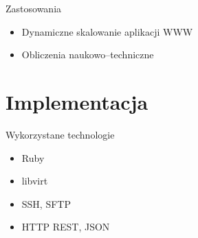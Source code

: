 \documentclass{beamer}
\begin{document}
\begin{frame}{Zastosowania}
  \begin{itemize}
    \item Dynamiczne skalowanie aplikacji WWW
    \item Obliczenia naukowo–techniczne
  \end{itemize}
\end{frame}

\section{Implementacja}
\begin{frame}{Wykorzystane technologie}
  \begin{itemize}
    \item Ruby
    \item libvirt
    \item SSH, SFTP
    \item HTTP REST, JSON
  \end{itemize}
\end{frame}
\end{document}
